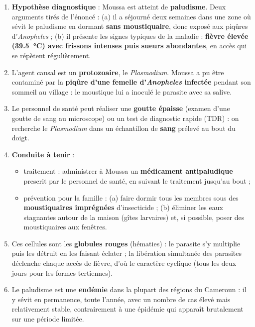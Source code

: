 \documentclass[11pt]{article}
\begin{document}
\begin{corrige}
\begin{enumerate}
\item \textbf{Hypothèse diagnostique} : Moussa est atteint de \textbf{paludisme}. Deux arguments tirés de l'énoncé : (a) il a séjourné deux semaines dans une zone où sévit le paludisme en dormant \textbf{sans moustiquaire}, donc exposé aux piqûres d'\emph{Anopheles} ; (b) il présente les signes typiques de la maladie : \textbf{fièvre élevée (\SI{39,5}{\celsius}) avec frissons intenses puis sueurs abondantes}, en accès qui se répètent régulièrement.
\item L'agent causal est un \textbf{protozoaire}, le \emph{Plasmodium}. Moussa a pu être contaminé par la \textbf{piqûre d'une femelle d'\emph{Anopheles} infectée} pendant son sommeil au village : le moustique lui a inoculé le parasite avec sa salive.
\item Le personnel de santé peut réaliser une \textbf{goutte épaisse} (examen d'une goutte de sang au microscope) ou un test de diagnostic rapide (TDR) : on recherche le \emph{Plasmodium} dans un échantillon de \textbf{sang} prélevé au bout du doigt.
\item \textbf{Conduite à tenir} :
\begin{itemize}
\item traitement : administrer à Moussa un \textbf{médicament antipaludique} prescrit par le personnel de santé, en suivant le traitement jusqu'au bout ;
\item prévention pour la famille : (a) faire dormir tous les membres sous des \textbf{moustiquaires imprégnées} d'insecticide ; (b) éliminer les eaux stagnantes autour de la maison (gîtes larvaires) et, si possible, poser des moustiquaires aux fenêtres.
\end{itemize}
\item Ces cellules sont les \textbf{globules rouges} (hématies) : le parasite s'y multiplie puis les détruit en les faisant éclater ; la libération simultanée des parasites déclenche chaque accès de fièvre, d'où le caractère cyclique (tous les deux jours pour les formes tertiennes).
\item Le paludisme est une \textbf{endémie} dans la plupart des régions du Cameroun : il y sévit en permanence, toute l'année, avec un nombre de cas élevé mais relativement stable, contrairement à une épidémie qui apparaît brutalement sur une période limitée.
\end{enumerate}

\end{corrige}
\end{document}
